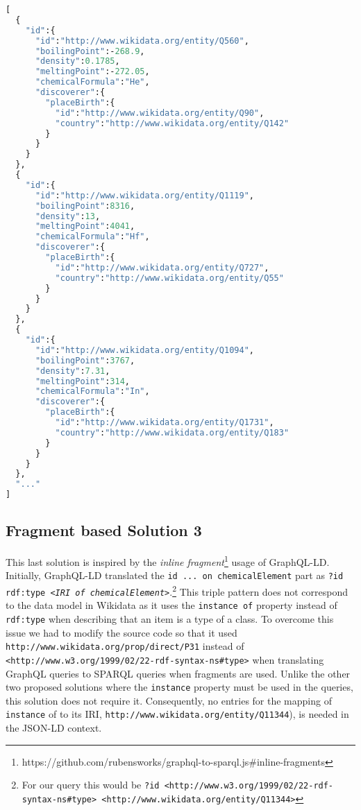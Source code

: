 \begin{minipage}{\linewidth}

\begin{lstlisting}[label=lst:27, caption={Results obtained}esults obtained, language=GraphQL]
[
  {
    "id":{
      "id":"http://www.wikidata.org/entity/Q560",
      "boilingPoint":-268.9,
      "density":0.1785,
      "meltingPoint":-272.05,
      "chemicalFormula":"He",
      "discoverer":{
        "placeBirth":{
          "id":"http://www.wikidata.org/entity/Q90",
          "country":"http://www.wikidata.org/entity/Q142"
        }
      }
    }
  },
  {
    "id":{
      "id":"http://www.wikidata.org/entity/Q1119",
      "boilingPoint":8316,
      "density":13,
      "meltingPoint":4041,
      "chemicalFormula":"Hf",
      "discoverer":{
        "placeBirth":{
          "id":"http://www.wikidata.org/entity/Q727",
          "country":"http://www.wikidata.org/entity/Q55"
        }
      }
    }
  },
  {
    "id":{
      "id":"http://www.wikidata.org/entity/Q1094",
      "boilingPoint":3767,
      "density":7.31,
      "meltingPoint":314,
      "chemicalFormula":"In",
      "discoverer":{
        "placeBirth":{
          "id":"http://www.wikidata.org/entity/Q1731",
          "country":"http://www.wikidata.org/entity/Q183"
        }
      }
    }
  },
  "..."
]
\end{lstlisting}
\end{minipage}

\subsection{Fragment based Solution 3}

This last solution is inspired by the \textit{inline fragment}\footnote{https://github.com/rubensworks/graphql-to-sparql.js\#inline-fragments} usage of GraphQL-LD. Initially, GraphQL-LD translated the \texttt{id ... on chemicalElement} part as \texttt{?id rdf:type \textit{<IRI of chemicalElement>}}.\footnote{For our query this would be \texttt{?id <http://www.w3.org/1999/02/22-rdf-syntax-ns\#type> <http://www.wikidata.org/entity/Q11344>}} This triple pattern does not correspond to the data model in Wikidata as it uses the \texttt{instance of} property instead of \texttt{rdf:type} when describing that an item is a type of a class. To overcome this issue we had to modify the source code so that it used \texttt{http://www.wikidata.org/prop/direct/P31} instead of \texttt{<http://www.w3.org/1999/02/22-rdf-syntax-ns\#type>} when translating GraphQL queries to SPARQL queries when fragments are used. Unlike the other two proposed solutions where the \texttt{instance} property must be used in the queries, this solution does not require it. Consequently, no entries for the mapping of \texttt{instance} of to its IRI, \texttt{http://www.wikidata.org/entity/Q11344}), is needed in the JSON-LD context.

